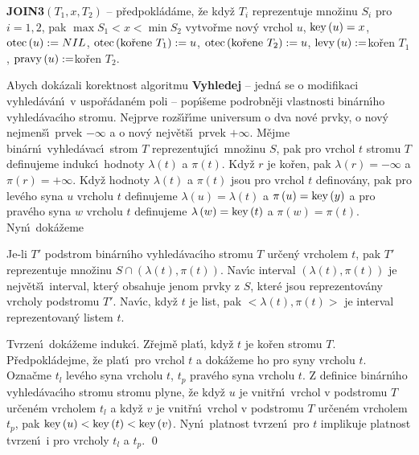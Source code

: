 {\bf JOIN3$\left(T_1,x,T_2\right)$} -- p\v redpokl\'ad\'ame, \v ze kdy\v z $
T_i$ reprezentuje 
mno\v zinu $S_i$ pro $i=1,2$, pak $\max S_1<x<\min S_2$\newline 
vytvo\v rme nov\'y vrchol $u$, $\operatorname{key}\left(u\right)=x$, $\operatorname{otec}\left(u\right):=NIL$, \newline 
$\otec\left(\text{ko\v rene }T_1\right):=u$, $\otec\left(\text{ko\v rene }T_2\right):=u$, \newline 
$\operatorname{levy}\left(u\right):=$ko\v ren $T_1$, $\operatorname{pravy}\left(u\right):=$ko\v ren $T_2$.
\medskip


\flushpar Abych dok\'azali korektnost algoritmu {\bf Vyhledej} -- 
jedn\'a se o modifikaci vyhled\'av\'an\'\i\ v uspo\v r\'adan\'em poli --
pop\'\i\v seme po\-drobn\v eji vlastnosti bin\'arn\'\i ho vyhled\'avac\'\i ho 
stromu. Nej\-prve roz\v s\'\i \v r\'\i me universum o dva nov\'e prvky, o nov\'y 
nejmen\v s\'\i\ prvek $-\infty$ a o nov\'y nejv\v et\v s\'\i\ prvek $+\infty$. 
M\v ejme bin\'arn\'\i\ vyhled\'avac\'\i\ strom $T$ reprezentuj\'\i c\'\i\ 
mno\v zinu $S$, pak pro vrchol $t$ stromu $T$ definujeme indukc\'\i\ hodnoty $\lambda\left(t\right)$ 
a $\pi\left(t\right)$. Kdy\v z $r$ je ko\v ren, pak $\lambda\left(r\right)=-\infty$ a $\pi\left(r\right)=+\infty$. 
Kdy\v z hodnoty $\lambda\left(t\right)$ a $\pi\left(t\right)$ jsou pro vrchol $t$ definov\'any, pak pro lev\'eho syna $u$ vrcholu $t$ definujeme $\lambda\left(u\right)=\lambda\left(t\right)$ a $\pi\left(u\right)=\operatorname{key}\left(y\right)$
a pro prav\'eho syna $w$ vrcholu $t$ definujeme $\lambda\left(w\right)=\operatorname{key}\left(t\right)$ a $\pi\left(w\right)=\pi\left(t\right)$.
Nyn\'\i\ dok\'a\v zeme

Je-li $T'$ podstrom bin\'arn\'\i ho vyhled\'avac\'\i ho 
stromu $T$ ur\v cen\'y vrcholem $t$, pak $T'$ reprezentuje mno\v zinu 
$S\cap \left(\lambda \left(t\right),\pi \left(t\right)\right)$. Nav\'\i c interval $\left(\lambda \left(t\right),\pi 
\left(t\right)\right)$ je nejv\v et\v s\'\i\ interval, 
kter\'y obsahuje jenom prvky z $S$, kter\'e jsou reprezentov\'any 
vrcholy podstromu $T'$. Nav\'\i c, kdy\v z $t$ je list, pak $<\lambda\left(t\right),\pi\left(t\right)>$ je interval reprezentovan\'y listem $t$.
\endproclaim


Tvrzen\'\i\ dok\'a\v zeme indukc\'\i .  Z\v rejm\v e plat\'\i , 
kdy\v z $t$ je ko\v ren stromu $T$.  P\v redpokl\'adej\-me, \v ze plat\'\i\ pro vrchol 
$t$ a dok\'a\-\v ze\-me ho pro syny vrcholu $t$.  Ozna\v cme $t_l$ lev\'eho syna 
vrcholu $t$, $t_p$ prav\'eho syna vrcholu $t$.  Z definice bin\'arn\'\i ho 
vyhled\'avac\'\i ho stromu stromu plyne, \v ze kdy\v z $u$ je vnit\v rn\'\i\ 
vrchol v podstromu $T$ ur\v cen\'em vrcholem $t_l$ a kdy\v z $v$ je vnit\v rn\'\i\ 
vrchol v podstromu $T$ ur\v cen\'em vrcholem $t_p$, pak 
$\operatorname{key}\left(u\right)<\operatorname{key}\left(t\right)<\operatorname{key}\left(v\right)$.  Nyn\'\i\ platnost tvrzen\'\i\ pro $t$ 
implikuje platnost tvrzen\'\i\ i pro vrcholy $t_l$ a $t_p$.  \qed
\enddemo
\medskip

